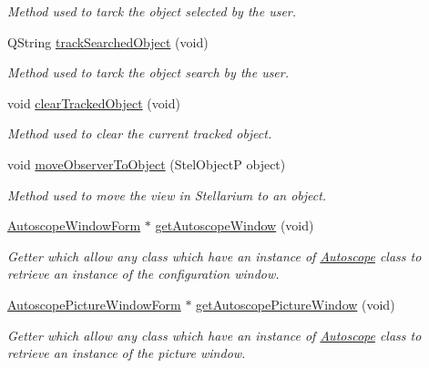 \begin{DoxyCompactItemize}
\begin{DoxyCompactList}\small\item\em Method used to tarck the object selected by the user. \end{DoxyCompactList}\item 
Q\+String \mbox{\hyperlink{class_autoscope_ac5a2819eb2d6971becc544d9f7136b79}{track\+Searched\+Object}} (void)
\begin{DoxyCompactList}\small\item\em Method used to tarck the object search by the user. \end{DoxyCompactList}\item 
void \mbox{\hyperlink{class_autoscope_a2bf2306aa6d3f37dadd83e6e00a35ff3}{clear\+Tracked\+Object}} (void)
\begin{DoxyCompactList}\small\item\em Method used to clear the current tracked object. \end{DoxyCompactList}\item 
void \mbox{\hyperlink{class_autoscope_ac8f9e09385739a5ba5ed460c83ec88df}{move\+Observer\+To\+Object}} (Stel\+ObjectP object)
\begin{DoxyCompactList}\small\item\em Method used to move the view in Stellarium to an object. \end{DoxyCompactList}\item 
\mbox{\hyperlink{class_autoscope_window_form}{Autoscope\+Window\+Form}} $\ast$ \mbox{\hyperlink{class_autoscope_aad8f888c886f1f3e36878e8c3e658813}{get\+Autoscope\+Window}} (void)
\begin{DoxyCompactList}\small\item\em Getter which allow any class which have an instance of \mbox{\hyperlink{class_autoscope}{Autoscope}} class to retrieve an instance of the configuration window. \end{DoxyCompactList}\item 
\mbox{\hyperlink{class_autoscope_picture_window_form}{Autoscope\+Picture\+Window\+Form}} $\ast$ \mbox{\hyperlink{class_autoscope_a78d970ac013a0640bc28cac027737848}{get\+Autoscope\+Picture\+Window}} (void)
\begin{DoxyCompactList}\small\item\em Getter which allow any class which have an instance of \mbox{\hyperlink{class_autoscope}{Autoscope}} class to retrieve an instance of the picture window. \end{DoxyCompactList}\item 

\end{DoxyCompactItemize}
